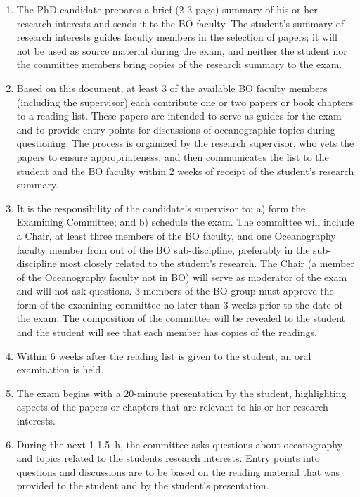 \documentclass[12pt]{article}
\begin{document}
\begin{enumerate}

\item The PhD candidate prepares a brief (2-3 page) summary of his or her
research interests and sends it to the BO faculty. The student's summary of
research interests guides faculty members in the selection of papers; it will
not be used as source material during the exam, and neither the student nor the
committee members bring copies of the research summary to the exam.

\item Based on this document, at least 3 of the available BO faculty members
(including the supervisor) each contribute one or two papers or book chapters
to a reading list. These papers are intended to serve as guides for the exam
and to provide entry points for discussions of oceanographic topics during
questioning. The process is organized by the research supervisor, who vets the
papers to ensure appropriateness, and then communicates the list to the student
and the BO faculty within 2 weeks of receipt of the student's research summary.

\item It is the responsibility of the candidate's supervisor to: a) form the
Examining Committee; and b) schedule the exam. The committee will include a
Chair, at least three members of the BO faculty, and one Oceanography faculty
member from out of the BO sub-discipline, preferably in the sub-discipline most
closely related to the student's research. The Chair (a member of the
Oceanography faculty not in BO) will serve as moderator of the exam and will
not ask questions. 3 members of the BO group must approve the form of the
examining committee no later than 3 weeks prior to the date of the exam. The
composition of the committee will be revealed to the student and the student
will see that each member has copies of the readings.

\item Within 6 weeks after the reading list is given to the student, an oral
examination is held.

\item The exam begins with a 20-minute presentation by the student,
highlighting aspects of the papers or chapters that are relevant to his or her
research interests.

\item During the next 1-1.5~h, the committee asks questions about oceanography
and topics related to the students research interests. Entry points into
questions and discussions are to be based on the reading material that was
provided to the student and by the student's presentation.


\end{enumerate}
\end{document}
